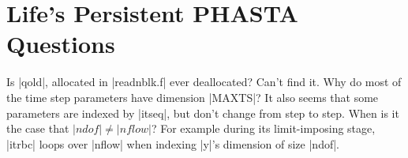 \documentclass[11pt]{article}
\begin{document}
\section{Life's Persistent PHASTA Questions}
\begin{outline}[deep]
	\1 Is |qold|, allocated in |readnblk.f| ever deallocated? Can't find it.
	\1 Why do most of the time step parameters have dimension |MAXTS|?
		\2 It also seems that some parameters are indexed by |itseq|, but don't change from step to step.
	\1 When is it the case that $|ndof| \ne |nflow|$? For example during its limit-imposing stage, |itrbc| loops over |nflow| when indexing |y|'s dimension of size |ndof|.
\end{outline}

\label{lastpage}
\end{document}
